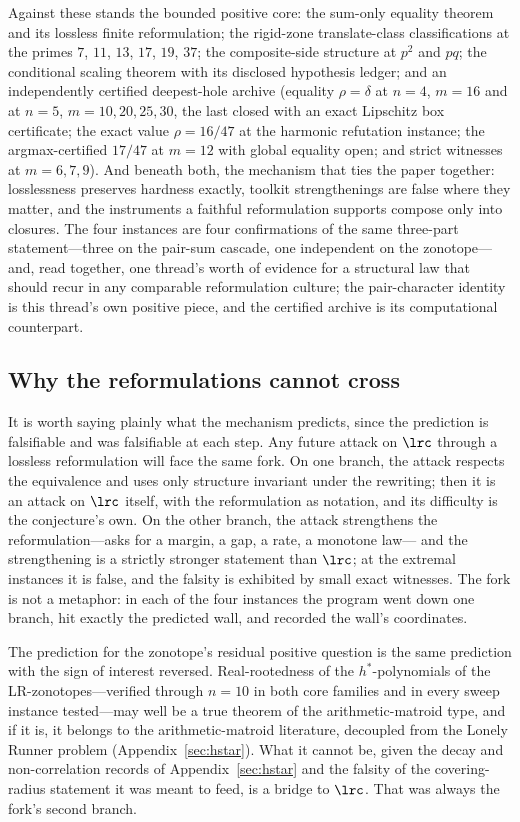 Against these stands the bounded positive core: the sum-only equality
theorem and its lossless finite reformulation; the rigid-zone
translate-class classifications at the primes $7$, $11$, $13$, $17$,
$19$, $37$; the composite-side structure at $p^2$ and $pq$; the
conditional scaling theorem with its disclosed hypothesis ledger; and an
independently certified deepest-hole archive (equality $\rho=\delta$ at
$n=4$, $m=16$ and at $n=5$, $m=10,20,25,30$, the last closed with an
exact Lipschitz box certificate; the exact value $\rho=16/47$ at the
harmonic refutation instance; the argmax-certified $17/47$ at $m=12$
with global equality open; and strict witnesses at $m=6,7,9$). And
beneath both, the mechanism that ties the paper together: losslessness
preserves hardness exactly, toolkit strengthenings are false where they
matter, and the instruments a faithful reformulation supports compose
only into closures. The four instances are four confirmations of the
same three-part statement---three on the pair-sum cascade, one
independent on the zonotope---and, read together, one thread's worth of
evidence for a structural law that should recur in any comparable
reformulation culture; the pair-character identity is this thread's own
positive piece, and the certified archive is its computational
counterpart.

\subsection{Why the reformulations cannot cross}

It is worth saying plainly what the mechanism predicts, since the
prediction is falsifiable and was falsifiable at each step. Any future
attack on $\lrc$ through a lossless reformulation will face the same
fork. On one branch, the attack respects the equivalence and uses only
structure invariant under the rewriting; then it is an attack on
$\lrc$ itself, with the reformulation as notation, and its difficulty
is the conjecture's own. On the other branch, the attack strengthens
the reformulation---asks for a margin, a gap, a rate, a monotone law---
and the strengthening is a strictly stronger statement than $\lrc$;
at the extremal instances it is false, and the falsity is exhibited by
small exact witnesses. The fork is not a metaphor: in each of the four
instances the program went down one branch, hit exactly the predicted
wall, and recorded the wall's coordinates.

The prediction for the zonotope's residual positive question is the same
prediction with the sign of interest reversed. Real-rootedness of the
$h^*$-polynomials of the LR-zonotopes---verified through $n=10$ in both
core families and in every sweep instance tested---may well be a true
theorem of the arithmetic-matroid type, and if it is, it belongs to the
arithmetic-matroid literature, decoupled from the Lonely Runner problem
(Appendix~\ref{sec:hstar}). What it cannot be, given the decay and
non-correlation records of Appendix~\ref{sec:hstar} and the falsity of
the covering-radius statement it was meant to feed, is a bridge to
$\lrc$. That was always the fork's second branch.

